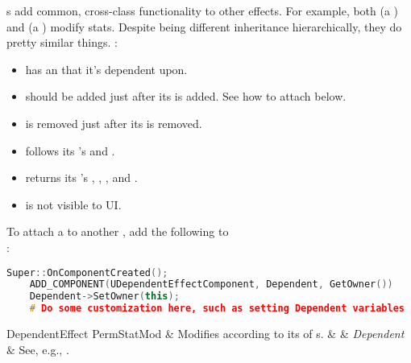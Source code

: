 



s add common, cross-class functionality to other effects. For example, both  (a ) and  (a ) modify stats. Despite being different inheritance hierarchically, they do pretty similar things. :
\begin{itemize}
	\item{has an  that it's dependent upon.}
	\item{should be added just after its  is added. See how to attach below.}
	\item{is removed just after its  is removed.}
	\item{follows its 's  and .}
	\item{returns its 's , , , and .}
	\item{is not visible to UI.}
\end{itemize}
To attach a  to another , add the following to\\:
\begin{lstlisting}[language=c++]
	Super::OnComponentCreated();
	ADD_COMPONENT(UDependentEffectComponent, Dependent, GetOwner())
	Dependent->SetOwner(this);
	# Do some customization here, such as setting Dependent variables
\end{lstlisting}

\begin{EffectTable}{DependentEffect}
	PermStatMod	& {Modifies according to its  of s.}	&  & \textit{Dependent} & See, e.g., .\\
\end{EffectTable}


\postamble{}